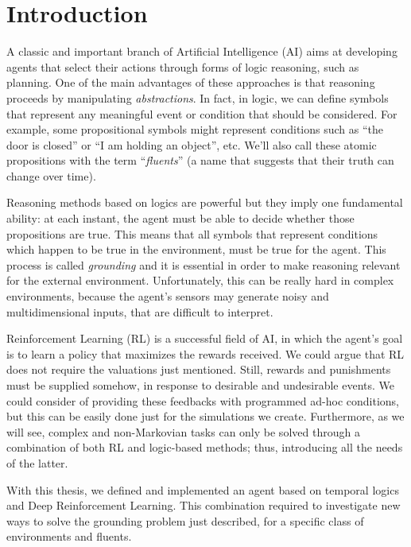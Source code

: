 \chapter{Introduction}

A classic and important branch of Artificial Intelligence (AI) aims at
developing agents that select their actions through forms of logic reasoning,
such as planning. One of the main advantages of these approaches is that
reasoning proceeds by manipulating \emph{abstractions}. In fact, in logic,
we can define symbols that represent any meaningful event or condition that
should be considered. For example, some propositional symbols might represent
conditions such as ``the door is closed'' or ``I am holding an object'', etc.
We'll also call these atomic propositions with the term ``\emph{fluents}''
(a name that suggests that their truth can change over time).

Reasoning methods based on logics are powerful but they imply one fundamental
ability: at each instant, the agent must be able to decide whether those
propositions are true. This means that all symbols that represent conditions
which happen to be true in the environment, must be true for the agent. This
process is called \emph{grounding} and it is essential in order to make
reasoning relevant for the external environment. Unfortunately, this can be
really hard in complex environments, because the agent's sensors may generate
noisy and multidimensional inputs, that are difficult to interpret.

Reinforcement Learning (RL) is a successful field of AI, in which the
agent's goal is to learn a policy that maximizes the rewards received.  We
could argue that RL does not require the valuations just mentioned. Still,
rewards and punishments must be supplied somehow, in response to desirable and
undesirable events. We could consider of providing these feedbacks with
programmed ad-hoc conditions, but this can be easily done just for the
simulations we create. Furthermore, as we will see, complex and non-Markovian
tasks can only be solved through a combination of both RL and logic-based
methods; thus, introducing all the needs of the latter.

With this thesis, we defined and implemented an agent based on temporal logics
and Deep Reinforcement Learning. This combination required to investigate new
ways to solve the grounding problem just described, for a specific class of
environments and fluents.
\enlargethispage{1\baselineskip}


